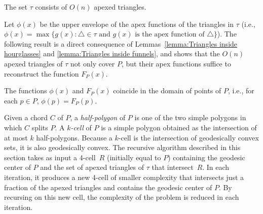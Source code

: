 \documentclass[a4paper,UKenglish]{lipics}
\newcommand{\F}[2]{\ensuremath{F_{\scriptscriptstyle #1}(#2)}}
\newcommand{\fn}[2]{\ensuremath{S_{\scriptscriptstyle #1}(#2)}}
\newcommand{\ff}[1]{\ensuremath{f(#1)}}
\newcommand{\g}[2]{\ensuremath{|\pi(#1, #2)|}}
\newcommand{\tcell}{4-cell\xspace}
\begin{document}
\begin{corollary}\label{lemma:Size of tau}
The set $\tau$ consists of $O(n)$ apexed triangles.
\end{corollary}

Let $\phi(x)$ be the upper envelope of the apex functions of the triangles in $\tau$ (i.e., $\phi(x) = \max\{g(x) : \triangle \in \tau\text{ and $g(x)$ is the apex function of $\triangle$} \}$). The following result is a direct consequence of Lemmas~\ref{lemma:Triangles inside hourglasses} and \ref{lemma:Triangles inside funnels}, and shows that the $O(n)$ apexed triangles of $\tau$ not only cover $P$, but their apex functions suffice to reconstruct the function $\F{P}{x}$.

\begin{lemma}\label{lemma:Optimization problem same as geodesic center}
The functions $\phi(x)$ and $\F{P}{x}$ coincide in the domain of points of $P$, i.e., for each $p\in P$, $\phi(p) = \F{P}{p}$.
\end{lemma}



Given a chord $C$ of $P$, a \emph{half-polygon} of $P$ is one of the two simple polygons in which $C$ splits $P$.
A \emph{$k$-cell} of $P$ is a simple polygon obtained as the intersection of at most $k$ half-polygons.
Because a $k$-cell is the intersection of geodesically convex sets, it is also geodesically convex. 
The recursive algorithm described in this section takes as input a \tcell~$R$ (initially equal to $P$) containing the geodesic center of $P$ and the set of apexed triangles of $\tau$ that intersect~$R$. In each iteration, it produces a new \tcell of smaller complexity that intersects just a fraction of the apexed triangles and contains the geodesic center of $P$. By recursing on this new cell, the complexity of the problem is reduced in each iteration.
\end{document}
